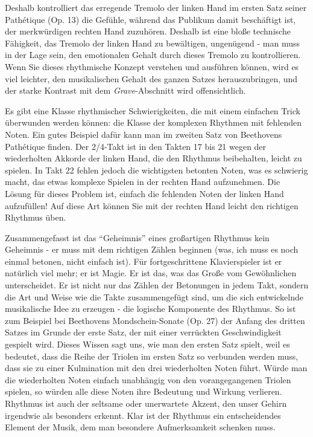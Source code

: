 Deshalb kontrolliert das erregende Tremolo der linken Hand im ersten Satz seiner Pathétique (Op. 13) die Gefühle, während das Publikum damit beschäftigt ist, der merkwürdigen rechten Hand zuzuhören.
Deshalb ist eine bloße technische Fähigkeit, das Tremolo der linken Hand zu bewältigen, ungenügend - man muss in der Lage sein, den emotionalen Gehalt durch dieses Tremolo zu kontrollieren.
Wenn Sie dieses rhythmische Konzept verstehen und ausführen können, wird es viel leichter, den musikalischen Gehalt des ganzen Satzes herauszubringen, und der starke Kontrast mit dem \textit{Grave}-Abschnitt wird offensichtlich.

Es gibt eine Klasse rhythmischer Schwierigkeiten, die mit einem einfachen Trick überwunden werden können: die Klasse der komplexen Rhythmen mit fehlenden Noten.
Ein gutes Beispiel dafür kann man im zweiten Satz von Beethovens Pathétique finden.
Der 2/4-Takt ist in den Takten 17 bis 21 wegen der wiederholten Akkorde der linken Hand, die den Rhythmus beibehalten, leicht zu spielen.
In Takt 22 fehlen jedoch die wichtigsten betonten Noten, was es schwierig macht, das etwas komplexe Spielen in der rechten Hand aufzunehmen.
Die Lösung für dieses Problem ist, einfach die fehlenden Noten der linken Hand aufzufüllen!
Auf diese Art können Sie mit der rechten Hand leicht den richtigen Rhythmus üben.

Zusammengefasst ist das \enquote{Geheimnis} eines großartigen Rhythmus kein Geheimnis - er muss mit dem richtigen Zählen beginnen (was, ich muss es noch einmal betonen, nicht einfach ist).
Für fortgeschrittene Klavierspieler ist er natürlich viel mehr; er ist Magie.
Er ist das, was das Große vom Gewöhnlichen unterscheidet.
Er ist nicht nur das Zählen der Betonungen in jedem Takt, sondern die Art und Weise wie die Takte zusammengefügt sind, um die sich entwickelnde musikalische Idee zu erzeugen - die logische Komponente des Rhythmus.
So ist zum Beispiel bei Beethovens Mondschein-Sonate (Op. 27) der Anfang des dritten Satzes im Grunde der erste Satz, der mit einer verrückten Geschwindigkeit gespielt wird.
Dieses Wissen sagt uns, wie man den ersten Satz spielt, weil es bedeutet, dass die Reihe der Triolen im ersten Satz so verbunden werden muss, dass sie zu einer Kulmination mit den drei wiederholten Noten führt.
Würde man die wiederholten Noten einfach unabhängig von den vorangegangenen Triolen spielen, so würden alle diese Noten ihre Bedeutung und Wirkung verlieren.
Rhythmus ist auch der seltsame oder unerwartete Akzent, den unser Gehirn irgendwie als besonders erkennt.
Klar ist der Rhythmus ein entscheidendes Element der Musik, dem man besondere Aufmerksamkeit schenken muss.
 

